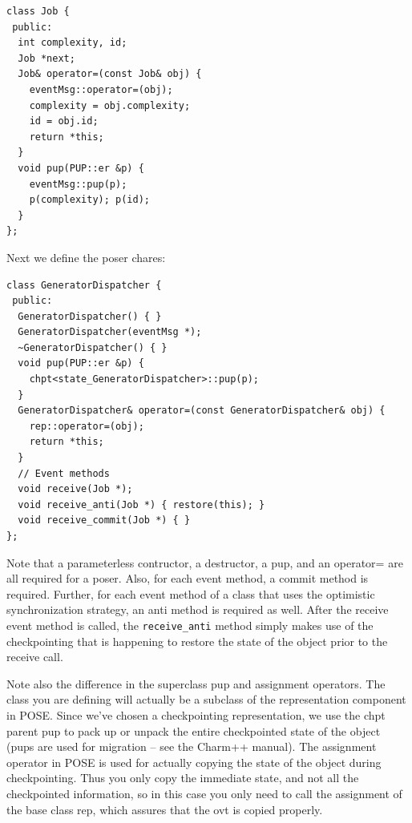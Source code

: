 \documentclass[10pt]{article}
\begin{document}
\begin{verbatim}
class Job {
 public:
  int complexity, id;
  Job *next;
  Job& operator=(const Job& obj) {
    eventMsg::operator=(obj);
    complexity = obj.complexity;
    id = obj.id;
    return *this;
  }
  void pup(PUP::er &p) {
    eventMsg::pup(p);
    p(complexity); p(id);
  }
};
\end{verbatim}

Next we define the poser chares:

\begin{verbatim}
class GeneratorDispatcher {
 public:
  GeneratorDispatcher() { }
  GeneratorDispatcher(eventMsg *);
  ~GeneratorDispatcher() { }
  void pup(PUP::er &p) {
    chpt<state_GeneratorDispatcher>::pup(p);
  }
  GeneratorDispatcher& operator=(const GeneratorDispatcher& obj) {
    rep::operator=(obj);
    return *this;
  }  
  // Event methods
  void receive(Job *);
  void receive_anti(Job *) { restore(this); }
  void receive_commit(Job *) { }
};
\end{verbatim}

Note that a parameterless contructor, a destructor, a pup, and an
operator= are all required for a poser.  Also, for each event method,
a commit method is required.  Further, for each event method of a
class that uses the optimistic synchronization strategy, an anti
method is required as well.  After the receive event method is called,
the \verb|receive_anti| method simply makes use of the checkpointing
that is happening to restore the state of the object prior to the
receive call.

Note also the difference in the superclass pup and assignment
operators.  The class you are defining will actually be a subclass of
the representation component in POSE.  Since we've chosen a
checkpointing representation, we use the chpt parent pup to pack up or
unpack the entire checkpointed state of the object (pups are used for
migration -- see the Charm++ manual).  The assignment operator
in POSE is used for actually copying the state of the object during
checkpointing.  Thus you only copy the immediate state, and not all the
checkpointed information, so in this case you only need to call the
assignment of the base class rep, which assures that the ovt is copied
properly. 
\end{document}
